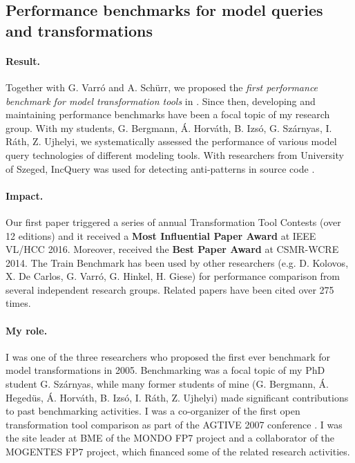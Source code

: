 
\subsection{Performance benchmarks for model queries and transformations}
\paragraph{Result.}
Together with G. Varró and A. Schürr, we proposed the \emph{first performance benchmark for model transformation tools} in \cite{vlhcc05-vsv}. Since then, developing and maintaining performance benchmarks have been a focal topic of my research group. With my students, G. Bergmann, Á. Horváth, B. Izsó, G. Szárnyas, I. Ráth, Z. Ujhelyi, we systematically assessed the performance of various model query technologies \cite{Bergmann-sttt10,scp2015,ttc2015} of different modeling tools. 
With researchers from University of Szeged, IncQuery was used for detecting anti-patterns in source code \cite{csmr2014,ist2015}.

\paragraph{Impact.} 
Our first paper \cite{vlhcc05-vsv} triggered a series of annual Transformation Tool Contests (over 12 editions) and it received a \textbf{Most Influential Paper Award} at IEEE VL/HCC 2016. Moreover, \cite{csmr2014} received the \textbf{Best Paper Award} at CSMR-WCRE 2014. The Train Benchmark \cite{ttc2015,sosym2017-tb} has been used by other researchers (e.g. D. Kolovos, X. De Carlos, G. Varró, G. Hinkel, H. Giese) for performance comparison from several independent research groups. Related papers have been cited over 275 times.

\paragraph{My role.} 
I was one of the three researchers who proposed the first ever benchmark for model transformations in 2005. Benchmarking was a focal topic of my PhD student G. Szárnyas, while many former students of mine (G. Bergmann, Á. Hegedüs, Á. Horváth, B. Izsó, I. Ráth, Z. Ujhelyi) made significant contributions to past benchmarking activities. I was a co-organizer of the first open transformation tool comparison as part of the AGTIVE 2007 conference \cite{agtive07-toolcontest}. I was the site leader at BME of the MONDO FP7 project and a collaborator of the MOGENTES FP7 project, which financed some of the related research activities.

